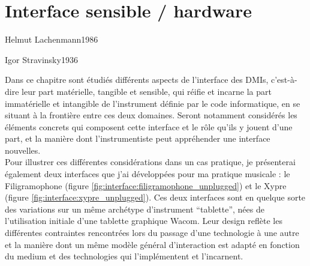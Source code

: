 %
\chapter{Interface sensible / hardware}
\label{ch:interfaces}

{Helmut Lachenmann}{1986}

{Igor Stravinsky}{1936}

\noindent Dans ce chapitre sont étudiés différents aspects de l'interface des \glspl{DMI}, c'est-à-dire leur part matérielle, tangible et sensible, qui réifie et incarne la part immatérielle et intangible de l'instrument définie par le code informatique, en se situant à la frontière entre ces deux domaines. Seront notamment considérés les éléments concrets qui composent cette interface et le rôle qu'ils y jouent d'une part, et la manière dont l'instrumentiste peut appréhender une interface nouvelles.\\
\indent Pour illustrer ces différentes considérations dans un cas pratique, je présenterai également deux interfaces que j'ai développées pour ma pratique musicale : le Filigramophone (figure \ref{fig:interface:filigramophone_unplugged}) et le Xypre (figure \ref{fig:interface:xypre_unplugged}). Ces deux interfaces sont en quelque sorte des variations sur un même archétype d'instrument ``tablette'', nées de l'utilisation initiale d'une tablette graphique Wacom. Leur design reflète les différentes contraintes rencontrées lors du passage d'une technologie à une autre et la manière dont un même modèle général d'interaction est adapté en fonction du medium et des technologies qui l'implémentent et l'incarnent.

\clearpage

